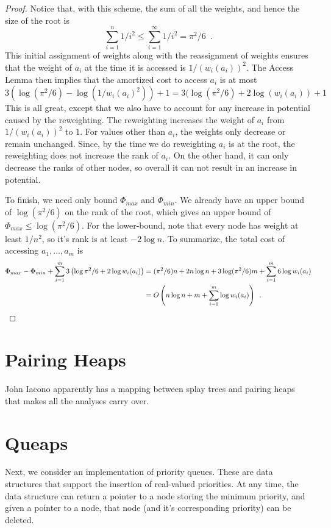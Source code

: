 {\begin{proof}
Notice that, with this scheme, the sum of all the weights, and hence the size of the root is
\[
    \sum_{i=1}^n 1/i^2 \le \sum_{i=1}^\infty 1/i^2 = \pi^2/6 \enspace .
\]
This initial assignment of weights along with the reassignment of
weights ensures that the weight of $a_i$ at the time it is accessed
is $1/(w_i(a_i))^2$.  The Access Lemma then implies that the amortized
cost to access $a_i$ is at most
\[
   3(\log(\pi^2/6) - \log(1/w_i(a_i)^2)) + 1 
   = 3(\log(\pi^2/6) + 2\log(w_i(a_i)) + 1
\]
This is all great, except that we also have to account for any increase in potential caused by the reweighting. The reweighting increases the weight of $a_i$ from $1/(w_i(a_i))^2$ to $1$. For values other than $a_i$, the weights only decrease or remain unchanged.  Since, by the time we do reweighting $a_i$ is at the root, the reweighting does not increase the rank of $a_i$.  On the other hand, it can only decrease the ranks of other nodes, so overall it can not result in an increase in potential.

To finish, we need only bound $\Phi_{max}$ and $\Phi_{min}$.  We already have an upper bound of $\log (\pi^2/6)$ on the rank of the root, which gives an upper bound of $\Phi_{max}\le \log (\pi^2/6)$.  For the lower-bound, note that every node has weight at least $1/n^2$, so it's rank is at least $-2\log n$.  To summarize, the total cost of accessing $a_1,\ldots,a_m$ is
\begin{align*}
   \Phi_{max} - \Phi_{min} + \sum_{i=1}^m 3\left(\log\pi^2/6 + 2\log w_i(a_i)\right) 
   & = (\pi^2/6)n + 2n\log n + 3\log(\pi^2/6)m + \sum_{i=1}^m 6\log w_i(a_i) \\
  & = O\left(n\log n + m + \sum_{i=1}^m \log w_i(a_i)\right) \enspace .\qedhere
\end{align*}

\end{proof}

\section{Pairing Heaps}

John Iacono apparently has a mapping between splay trees and pairing
heaps that makes all the analyses carry over.

\section{Queaps}

Next, we consider an implementation of priority queues.  These are
data structures that support the insertion of real-valued priorities.
At any time, the data structure can return a pointer to a node storing
the minimum priority, and given a pointer to a node, that node (and
it's corresponding priority) can be deleted.

}
